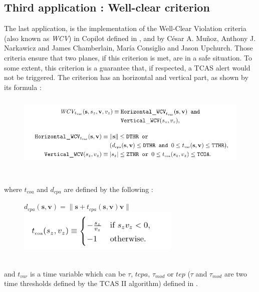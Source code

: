 \documentclass[a4paper,11pt,final]{article}
\begin{document}
	\subsection{Third application : Well-clear criterion}
	The last application, is the implementation of the Well-Clear Violation criteria (also known as \emph{WCV}) in Copilot defined in \cite{WCV1}, \cite{WCV2} and \cite{WCV3} by C\'esar A. Mu\~{n}oz, Anthony J. Narkawicz and James Chamberlain, Mar\'ia Consiglio and Jason Upchurch. Those criteria ensure that two planes, if this criterion is met, are in a safe situation. To some extent, this criterion is a guarantee that, if respected, a TCAS alert would not be triggered. The criterion has an horizontal and vertical part, as shown by its formula : 
	\begin{figure}[!htb]
		\centering
		\includegraphics[height=35mm]{images/WCV/wcv.pdf}\\
	\end{figure}\\
	where $t_{coa}$ and $d_{cpa}$ are defined by the following :
	\begin{figure}[!ht]
		\centering
		$d_{cpa} (\textbf{s},\textbf{v}) = \parallel \textbf{s} + t_{cpa}(\textbf{s}, \textbf{v})\textbf{v} \parallel$\\ \includegraphics[height=20mm]{images/WCV/tcoa.pdf}
	\end{figure}\\
	and $t_{var}$ is a time variable which can be $\tau$, $tcpa$, $\tau_{mod}$ or $tep$ ($\tau$ and $\tau_{mod}$ are two time thresholds defined by the TCAS II algorithm) defined in \cite{WCV1}.
	
\end{document}
